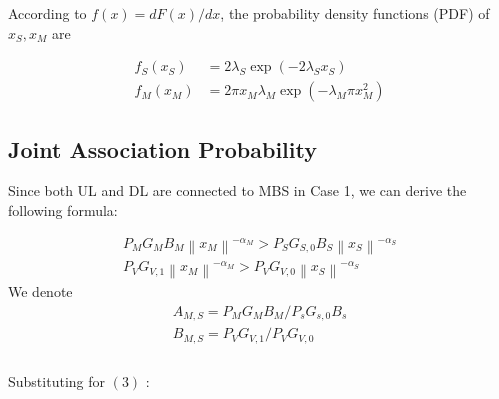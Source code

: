 \documentclass[conference]{IEEEtran}
\begin{document}
\begin{CJK*}{UTF8}{bsmi}
According to $f(x) = dF(x)/dx$, the probability density
functions (PDF) of $x_S, x_M$ are

\begin{equation}
\begin{aligned}
f_S\left(x_S\right) & =2 \lambda_S \exp \left(-2 \lambda_S x_S\right) \\
f_M\left(x_M\right) & =2 \pi x_M \lambda_M \exp \left(-\lambda_M \pi x_M^2\right)
\end{aligned}
\end{equation}


\subsection{Joint Association Probability}

Since both UL and DL are connected to MBS in Case 1, we can derive the following formula:

\begin{equation}
\begin{aligned}
P_M G_M B_M\left\|x_M\right\|^{-\alpha_M}>P_S G_{S, 0} B_S\left\|x_S\right\|^{-\alpha_S} \\
P_V G_{V, 1}\left\|x_M\right\|^{-\alpha_M}>P_V G_{V, 0}\left\|x_S\right\|^{-\alpha_S}
\end{aligned}
\end{equation}
We denote
\begin{equation}
\begin{aligned}
A_{M, S}=P_M G_M B_M / P_s G_{s, 0} B_s \\
B_{M, S}=P_V G_{V, 1} / P_V G_{V, 0}\\
\end{aligned}
\end{equation} \\

Substituting for $(3)$ :


\end{CJK*}
\end{document}

